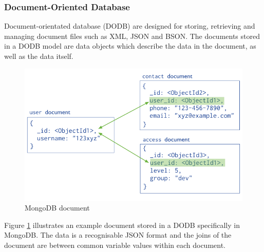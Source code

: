 \subsubsection{Document-Oriented Database}
Document-orientated database (DODB) are designed for storing, retrieving and managing document files such as XML, JSON and BSON. The documents stored in a DODB model are data objects which describe the data in the document, as well as the data itself. \begin{figure}[h]\begin{center}\includegraphics[width=0.75\linewidth]{images/mongodbmodel}\caption{MongoDB document}\label{fig:mongo}\end{center}\end{figure} Figure \ref{fig:mongo} illustrates an example document stored in a DODB specifically in MongoDB. The data is a recognisable JSON format and the joins of the document are between common variable values within each document.

